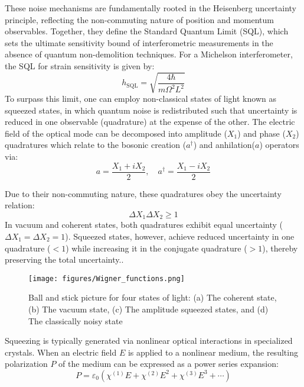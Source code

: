 \documentclass[colorlinks=true,pdfstartview=FitV,linkcolor=blue,
citecolor=red,urlcolor=magenta]{ligodoc}
\begin{document}
These noise mechanisms are fundamentally rooted in the Heisenberg uncertainty principle, reflecting the non-commuting nature of position and momentum observables. Together, they define the Standard Quantum Limit (SQL), which sets the ultimate sensitivity bound of interferometric measurements in the absence of quantum non-demolition techniques. For a Michelson interferometer, the SQL for strain sensitivity is given by:
\begin{equation}
    h_{\mathrm{SQL}} = \sqrt{\frac{4\hbar}{m \Omega^2 L^2}}
\end{equation}
To surpass this limit, one can employ non-classical states of light known as squeezed states, in which quantum noise is redistributed such that uncertainty is reduced in one observable (quadrature) at the expense of the other. The electric field of the optical mode can be decomposed into amplitude ($X_1$) and phase ($X_2$) quadratures which relate to the bosonic creation ($a^\dagger$) and anhilation($a$) operators via:
\begin{equation}
    a = \frac{X_1 + i X_2}{2}, \quad a^\dagger = \frac{X_1 - i X_2}{2}
\end{equation}

Due to their non-commuting nature, these quadratures obey the uncertainty relation:
\begin{equation}
    \Delta X_1 \Delta X_2 \geq 1
\end{equation}
In vacuum and coherent states, both quadratures exhibit equal uncertainty ($\Delta X_1= \Delta X_2=1$). Squeezed states, however, achieve reduced uncertainty in one quadrature ($<1$) while increasing it in the conjugate quadrature ($>1$), thereby preserving the total uncertainty.\cite{saleh_teich}.\\
\begin{figure}[H]
    \centering
    \texttt{[image: figures/Wigner\_functions.png]}
   \caption{  Ball and stick picture for four states of light: (a) The coherent state, (b) The vacuum state, (c)
The amplitude squeezed states, and (d) The classically noisy state\cite{mckenzie} }
    \label{fig:enter-label}
\end{figure}



Squeezing is typically generated via nonlinear optical interactions in specialized crystals. When an electric field $E$ is applied to a nonlinear medium, the resulting polarization $P$ of the medium can be expressed as a power series expansion:
\begin{equation}
    P = \varepsilon_0 \left( \chi^{(1)} E + \chi^{(2)} E^2 + \chi^{(3)} E^3 + \cdots \right)
\end{equation}
\end{document}
